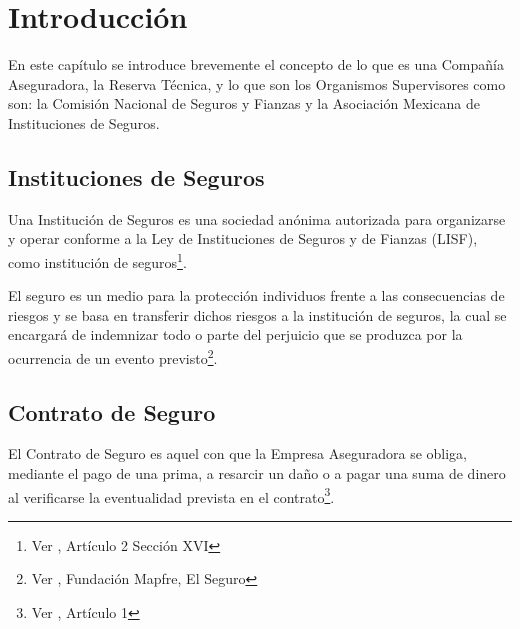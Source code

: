 \documentclass[11pt,twoside,openright,spanish]{report}
\numberwithin{equation}{chapter}
\numberwithin{figure}{chapter}
\numberwithin{table}{chapter}
\renewcommand{\footrulewidth}{0pt}
\renewcommand{\headrulewidth}{0.1pt}
\begin{document}
	
	\fancypagestyle{plain}{
		\fancyhead[L]{}
		\fancyhead[C]{}
		\fancyhead[R]{}
		
		\fancyfoot[L]{}
		\fancyfoot[C]{\thepage}
		\fancyfoot[R]{}
		\renewcommand{\headrulewidth}{0pt}
		\renewcommand{\footrulewidth}{0pt}
	}
	
	\fancyhead[LE]{\scshape\thepage\hspace{1cm}\footnotesize\nouppercase{\leftmark}}
	\fancyhead[LO]{}
	\fancyhead[RE]{}
	\pagestyle{fancy}
	\cleardoublepage
	
	\chapter{Introducción}\label{cap:Introducción}

	En este capítulo se introduce brevemente el concepto de lo que es una Compañía Aseguradora, la Reserva Técnica, y lo que son los Organismos Supervisores como son: la Comisión Nacional de Seguros y Fianzas y la Asociación Mexicana de Instituciones de Seguros.
	
	\section{Instituciones de Seguros}

	Una Institución de Seguros es una sociedad anónima autorizada para organizarse y operar conforme a la Ley de Instituciones de Seguros y de Fianzas (LISF), como institución de seguros\footnote{Ver \citet{BAseguradora}, Artículo 2 Sección XVI}.

	El seguro es un medio para la protección individuos frente a las consecuencias de riesgos y se basa en transferir dichos riesgos a la institución de seguros, la cual se encargará de indemnizar todo o parte del perjuicio que se produzca por la ocurrencia de un evento previsto\footnote{Ver \citet{ASeguro}, Fundación Mapfre, El Seguro}. 
	
	\section{Contrato de Seguro}
	
	El Contrato de Seguro es aquel con que la Empresa Aseguradora se obliga, mediante el pago de una prima, a resarcir un daño o a pagar una suma de dinero al verificarse la eventualidad prevista en el contrato\footnote{Ver \citet{CContrato}, Artículo 1}.
	
\end{document}
